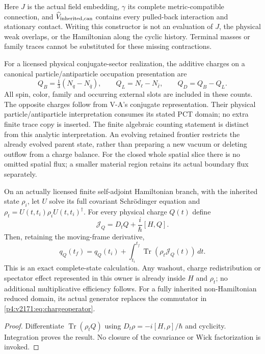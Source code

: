 \documentclass[12pt,a4paper]{article}
\begin{document}
Here $J$ is the actual field embedding, $\gamma$ its complete metric-compatible
connection, and $\widehat V_{\rm inherited,can}$ contains every pulled-back
interaction and stationary contact. Writing this constructor is not an
evaluation of $J$, the physical weak overlaps, or the Hamiltonian along the
cyclic history. Terminal masses or family traces cannot be substituted for
these missing contractions.

For a licensed physical conjugate-sector realization, the additive charges
on a canonical particle/antiparticle occupation presentation are
\begin{equation}
 Q_B=\tfrac13(N_q-N_{\bar q}),\qquad
 Q_L=N_\ell-N_{\bar\ell},\qquad Q_D=Q_B-Q_L.
 \label{p4:v2171:eq:signedcharges}
\end{equation}
All spin, color, family and occurring external slots are included in these
counts. The opposite charges follow from V-A's conjugate representation.
Their physical particle/antiparticle interpretation consumes its stated
PCT domain; no extra finite trace copy is inserted. The finite algebraic
counting statement is distinct from this analytic interpretation.
An evolving retained frontier restricts the already evolved parent state,
rather than preparing a new vacuum or deleting outflow from a charge balance.
For the closed whole spatial slice there is no omitted spatial flux; a
smaller material region retains its actual boundary flux separately.

\begin{theorem}
\label{p4:v2171:thm:fullcharge}
On an actually licensed finite self-adjoint Hamiltonian branch, with the
inherited state $\rho_i$, let $U$ solve its full covariant Schr\"odinger
equation and $\rho_t=U(t,t_i)\rho_iU(t,t_i)^\dagger$.
For every physical charge $Q(t)$ define
\begin{equation}
 \mathcal J_Q=D_tQ+\frac{i}{\hbar}[H,Q].
 \label{p4:v2171:eq:chargeoperator}
\end{equation}
Then, retaining the moving-frame derivative,
\begin{equation}
 q_Q(t_f)=q_Q(t_i)+\int_{t_i}^{t_f}
                 \operatorname{Tr}(\rho_t\mathcal J_Q(t))\,dt.
 \label{p4:v2171:eq:fullintegral}
\end{equation}
This is an exact complete-state calculation. Any washout, charge
redistribution or spectator effect represented in this owner is already
inside $H$ and $\rho_t$; no additional multiplicative efficiency follows.
For a fully inherited non-Hamiltonian reduced domain, its actual generator
replaces the commutator in \eqref{p4:v2171:eq:chargeoperator}.
\end{theorem}
\begin{proof}
Differentiate $\operatorname{Tr}(\rho_tQ)$ using
$D_t\rho=-i[H,\rho]/\hbar$ and cyclicity. Integration proves the result.
No closure of the covariance or Wick factorization is invoked.
\end{proof}
\end{document}

